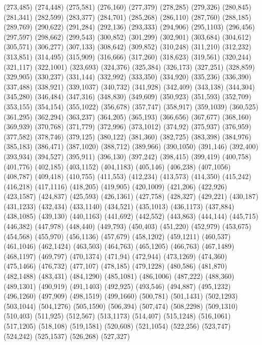 (273,485)
(274,448)
(275,581)
(276,160)
(277,379)
(278,285)
(279,326)
(280,845)
(281,341)
(282,599)
(283,377)
(284,701)
(285,268)
(286,110)
(287,760)
(288,185)
(289,769)
(290,622)
(291,284)
(292,136)
(293,333)
(294,906)
(295,1103)
(296,456)
(297,597)
(298,662)
(299,543)
(300,852)
(301,299)
(302,901)
(303,684)
(304,612)
(305,571)
(306,277)
(307,133)
(308,642)
(309,852)
(310,248)
(311,210)
(312,232)
(313,851)
(314,495)
(315,909)
(316,666)
(317,260)
(318,623)
(319,561)
(320,244)
(321,117)
(322,1001)
(323,693)
(324,376)
(325,384)
(326,173)
(327,251)
(328,859)
(329,905)
(330,237)
(331,144)
(332,992)
(333,350)
(334,920)
(335,236)
(336,390)
(337,488)
(338,921)
(339,1037)
(340,732)
(341,928)
(342,409)
(343,138)
(344,304)
(345,280)
(346,484)
(347,316)
(348,830)
(349,609)
(350,923)
(351,593)
(352,709)
(353,155)
(354,154)
(355,1022)
(356,678)
(357,747)
(358,917)
(359,1039)
(360,525)
(361,295)
(362,294)
(363,237)
(364,205)
(365,193)
(366,656)
(367,677)
(368,160)
(369,939)
(370,768)
(371,779)
(372,996)
(373,1012)
(374,92)
(375,937)
(376,959)
(377,582)
(378,746)
(379,125)
(380,122)
(381,360)
(382,725)
(383,398)
(384,976)
(385,183)
(386,471)
(387,1020)
(388,712)
(389,966)
(390,1050)
(391,146)
(392,400)
(393,934)
(394,527)
(395,911)
(396,130)
(397,242)
(398,415)
(399,419)
(400,758)
(401,776)
(402,185)
(403,1152)
(404,1183)
(405,146)
(406,238)
(407,1056)
(408,787)
(409,418)
(410,755)
(411,553)
(412,234)
(413,573)
(414,350)
(415,242)
(416,218)
(417,1116)
(418,205)
(419,905)
(420,1009)
(421,206)
(422,926)
(423,1587)
(424,837)
(425,593)
(426,1361)
(427,758)
(428,327)
(429,221)
(430,187)
(431,1233)
(432,434)
(433,1140)
(434,521)
(435,1013)
(436,1173)
(437,884)
(438,1085)
(439,130)
(440,1163)
(441,692)
(442,552)
(443,863)
(444,144)
(445,715)
(446,382)
(447,978)
(448,440)
(449,793)
(450,403)
(451,220)
(452,979)
(453,675)
(454,568)
(455,970)
(456,1136)
(457,679)
(458,1202)
(459,1211)
(460,537)
(461,1046)
(462,1424)
(463,503)
(464,763)
(465,1205)
(466,763)
(467,1489)
(468,1197)
(469,797)
(470,1374)
(471,94)
(472,944)
(473,1269)
(474,360)
(475,1466)
(476,732)
(477,107)
(478,185)
(479,1228)
(480,586)
(481,870)
(482,1488)
(483,431)
(484,1290)
(485,1081)
(486,1006)
(487,222)
(488,360)
(489,1301)
(490,919)
(491,1403)
(492,925)
(493,546)
(494,887)
(495,1232)
(496,1260)
(497,909)
(498,1519)
(499,1660)
(500,781)
(501,1431)
(502,1293)
(503,1044)
(504,1276)
(505,1590)
(506,394)
(507,474)
(508,2298)
(509,1310)
(510,403)
(511,925)
(512,567)
(513,1173)
(514,407)
(515,1248)
(516,1061)
(517,1205)
(518,108)
(519,1581)
(520,608)
(521,1054)
(522,256)
(523,747)
(524,242)
(525,1537)
(526,268)
(527,327)
